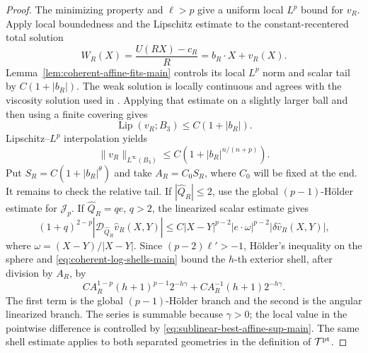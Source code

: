 \documentclass[11pt,reqno]{amsart}
\numberwithin{equation}{section}
\newcommand{\Jp}{\mathcal J_p}
\theoremstyle{remark}
\begin{document}
\begin{proof}
The minimizing property and \(\ell>p\) give a uniform local \(L^p\)
bound for \(v_R\).  Apply local boundedness and the Lipschitz estimate
\cite[Theorem~2.1]{BiswasTopp} to the constant-recentered total solution
\[
 W_R(X)=\frac{U(RX)-c_R}{R}=b_R\cdot X+v_R(X).
\]
Lemma~\ref{lem:coherent-affine-fits-main} controls its local \(L^p\)
norm and scalar tail by \(C(1+|b_R|)\).  The weak solution is locally
continuous and agrees with the viscosity solution used in
\cite[Proposition~1.5 and Theorem~2.1]{BiswasTopp}.  Applying that
estimate on a slightly larger ball and then using a finite covering
gives
\[
 \operatorname{Lip}(v_R;B_3)\le C(1+|b_R|).
\]
Lipschitz--\(L^p\) interpolation yields
\begin{equation}
 \|v_R\|_{L^\infty(B_3)}
 \le C(1+|b_R|^{n/(n+p)}).
 \label{eq:sublinear-best-affine-sup-main}
\end{equation}
Put \(S_R=C(1+|b_R|^\theta)\) and take \(A_R=C_0S_R\), where
\(C_0\) will be fixed at the end.  It remains to check the relative
tail.  If \(|\widehat Q_R|\le2\), use the global
\((p-1)\)-H\"older estimate for \(\Jp\).  If
\(\widehat Q_R=q e\), \(q>2\), the linearized scalar estimate gives
\begin{equation}
 (1+q)^{2-p}|\mathcal D_{\widehat Q_R}\widehat v_R(X,Y)|
 \le C|X-Y|^{p-2}|e\cdot\omega|^{p-2}
       |\delta\widehat v_R(X,Y)|,
 \label{eq:best-affine-angular-flux-main}
\end{equation}
where \(\omega=(X-Y)/|X-Y|\).  Since
\((p-2)\ell'>-1\), H\"older's inequality on the sphere and
\eqref{eq:coherent-log-shells-main} bound the \(h\)-th exterior shell,
after division by \(A_R\), by
\begin{equation}
 C A_R^{1-p}(h+1)^{p-1}2^{-h\gamma}
 +C A_R^{-1}(h+1)2^{-h\gamma}.
 \label{eq:best-affine-shell-series-main}
\end{equation}
The first term is the global \((p-1)\)-H\"older branch and the second
is the angular linearized branch.
The series is summable because \(\gamma>0\); the local value in the
pointwise difference is controlled by
\eqref{eq:sublinear-best-affine-sup-main}.  The same shell estimate
applies to both separated geometries in the definition of
\(\mathcal T^{\rm pt}\).


\end{proof}
\end{document}
